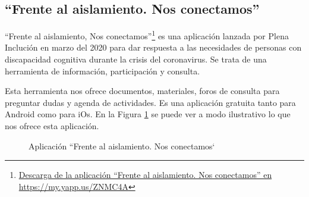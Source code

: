 \subsection{``Frente al aislamiento. Nos conectamos'' }

``Frente al aislamiento, Nos conectamos''\footnote{\href{https://my.yapp.us/ZNMC4A}{Descarga de la aplicación ``Frente al aislamiento. Nos conectamos'' en https://my.yapp.us/ZNMC4A}} es una aplicación lanzada por Plena Inclución en marzo del 2020 para dar respuesta a las necesidades de personas con discapacidad cognitiva durante la crisis del coronavirus. Se trata de una herramienta de información, participación y consulta.

Esta herramienta nos ofrece documentos, materiales, foros de consulta para preguntar dudas y agenda de actividades. Es una aplicación gratuita tanto para Android como para iOs. En la Figura \ref{fig:plenaInclusion} se puede ver a modo ilustrativo lo que nos ofrece esta aplicación.


\begin{figure}[h]
	\centering
	
	\caption{Aplicación ``Frente al aislamiento. Nos conectamos`}
	\label{fig:plenaInclusion}
\end{figure} 


